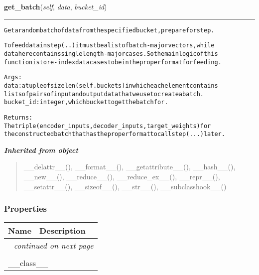 \hspace{.8\funcindent}\begin{boxedminipage}{\funcwidth}

    \raggedright \textbf{get\_batch}(\textit{self}, \textit{data}, \textit{bucket\_id})

    \vspace{-1.5ex}

    \rule{\textwidth}{0.5\fboxrule}
\setlength{\parskip}{2ex}
\begin{alltt}
Get a random batch of data from the specified bucket, prepare for step.

To feed data in step(..) it must be a list of batch-major vectors, while
data here contains single length-major cases. So the main logic of this
function is to re-index data cases to be in the proper format for feeding.

Args:
  data: a tuple of size len(self.buckets) in which each element contains
    lists of pairs of input and output data that we use to create a batch.
  bucket\_id: integer, which bucket to get the batch for.

Returns:
  The triple (encoder\_inputs, decoder\_inputs, target\_weights) for
  the constructed batch that has the proper format to call step(...) later.
\end{alltt}

\setlength{\parskip}{1ex}
    \end{boxedminipage}


\large{\textbf{\textit{Inherited from object}}}

\begin{quote}
\_\_delattr\_\_(), \_\_format\_\_(), \_\_getattribute\_\_(), \_\_hash\_\_(), \_\_new\_\_(), \_\_reduce\_\_(), \_\_reduce\_ex\_\_(), \_\_repr\_\_(), \_\_setattr\_\_(), \_\_sizeof\_\_(), \_\_str\_\_(), \_\_subclasshook\_\_()
\end{quote}


  \subsubsection{Properties}

    \vspace{-1cm}
\hspace{\varindent}\begin{longtable}{|p{\varnamewidth}|p{\vardescrwidth}|l}
\cline{1-2}
\cline{1-2} \centering \textbf{Name} & \centering \textbf{Description}& \\
\cline{1-2}
\endhead\cline{1-2}\multicolumn{3}{r}{\small\textit{continued on next page}}\\\endfoot\cline{1-2}
\endlastfoot\multicolumn{2}{|l|}{\textit{Inherited from object}}\\
\multicolumn{2}{|p{\varwidth}|}{\raggedright \_\_class\_\_}\\
\cline{1-2}
\end{longtable}

